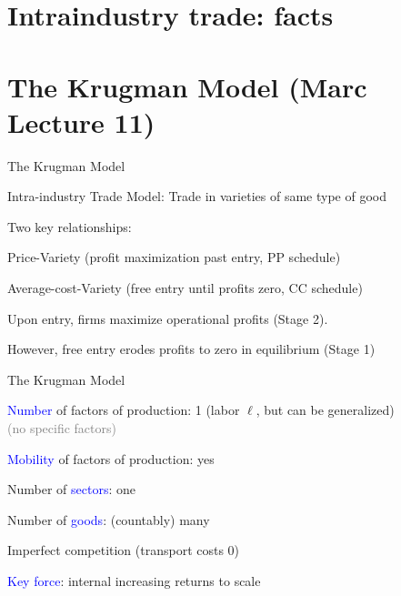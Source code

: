 \documentclass[notes,11pt, aspectratio=169, xcolor=table]{beamer}
\newcommand{\blue}[1]{\textcolor{blue}{#1}}
\newenvironment{wideitemize}{\itemize\addtolength{\itemsep}{10pt}}{\enditemize}
\begin{document}
\section{Intraindustry trade: facts}

\section{The Krugman Model (Marc Lecture 11)}

\begin{frame}{The Krugman Model}

\begin{wideitemize}
    \item Intra-industry Trade Model: Trade in varieties of same type of good

    \item Two key relationships:
    \begin{wideitemize}
        \item Price-Variety (profit maximization past entry, PP schedule)
        \item Average-cost-Variety (free entry until profits zero, CC schedule)
    \end{wideitemize}

    \item Upon entry, firms maximize operational profits (Stage 2).
    \item  However, free entry erodes profits to zero in equilibrium (Stage 1)
\end{wideitemize}
    
\end{frame}

\begin{frame}{The Krugman Model}
    \begin{wideitemize}
        \item \blue{Number} of factors of production: 1 (labor $\ell$, but can be generalized)\\
        \qquad \textcolor{gray}{(no specific factors)}
        
    \item<2-> \blue{Mobility} of factors of production: yes
    
    \item<3-> Number of \blue{sectors}: one 

    \item<4-> Number of \blue{goods}: (countably) many
    

    \item<5-> Imperfect competition (transport costs 0)

    \item<5-> \blue{Key force}: internal increasing returns to scale
    \end{wideitemize}    
\end{frame}
\end{document}
